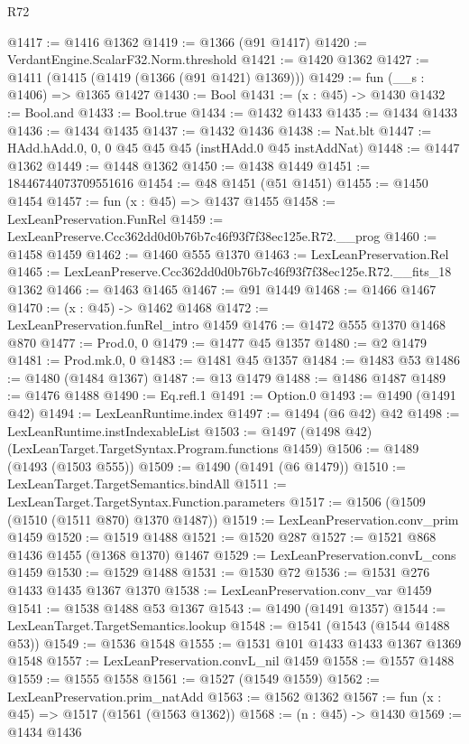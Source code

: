 \begin{lexlean}{R72}
\begin{coremodule}
@1417 := @1416 @1362
@1419 := @1366 (@91 @1417)
@1420 := VerdantEngine.ScalarF32.Norm.threshold
@1421 := @1420 @1362
@1427 := @1411 (@1415 (@1419 (@1366 (@91 @1421) @1369)))
@1429 := fun (__s : @1406) => @1365 @1427
@1430 := Bool
@1431 := (x : @45) -> @1430
@1432 := Bool.and
@1433 := Bool.true
@1434 := @1432 @1433
@1435 := @1434 @1433
@1436 := @1434 @1435
@1437 := @1432 @1436
@1438 := Nat.blt
@1447 := HAdd.hAdd.{0, 0, 0} @45 @45 @45 (instHAdd.{0} @45 instAddNat)
@1448 := @1447 @1362
@1449 := @1448 @1362
@1450 := @1438 @1449
@1451 := 18446744073709551616
@1454 := @48 @1451 (@51 @1451)
@1455 := @1450 @1454
@1457 := fun (x : @45) => @1437 @1455
@1458 := LexLeanPreservation.FunRel
@1459 := LexLeanPreserve.Ccc362dd0d0b76b7c46f93f7f38ec125e.R72.__prog
@1460 := @1458 @1459
@1462 := @1460 @555 @1370
@1463 := LexLeanPreservation.Rel
@1465 := LexLeanPreserve.Ccc362dd0d0b76b7c46f93f7f38ec125e.R72.__fits_18 @1362
@1466 := @1463 @1465
@1467 := @91 @1449
@1468 := @1466 @1467
@1470 := (x : @45) -> @1462 @1468
@1472 := LexLeanPreservation.funRel_intro @1459
@1476 := @1472 @555 @1370 @1468 @870
@1477 := Prod.{0, 0}
@1479 := @1477 @45 @1357
@1480 := @2 @1479
@1481 := Prod.mk.{0, 0}
@1483 := @1481 @45 @1357
@1484 := @1483 @53
@1486 := @1480 (@1484 @1367)
@1487 := @13 @1479
@1488 := @1486 @1487
@1489 := @1476 @1488
@1490 := Eq.refl.{1}
@1491 := Option.{0}
@1493 := @1490 (@1491 @42)
@1494 := LexLeanRuntime.index
@1497 := @1494 (@6 @42) @42
@1498 := LexLeanRuntime.instIndexableList
@1503 := @1497 (@1498 @42) (LexLeanTarget.TargetSyntax.Program.functions @1459)
@1506 := @1489 (@1493 (@1503 @555))
@1509 := @1490 (@1491 (@6 @1479))
@1510 := LexLeanTarget.TargetSemantics.bindAll
@1511 := LexLeanTarget.TargetSyntax.Function.parameters
@1517 := @1506 (@1509 (@1510 (@1511 @870) @1370 @1487))
@1519 := LexLeanPreservation.conv_prim @1459
@1520 := @1519 @1488
@1521 := @1520 @287
@1527 := @1521 @868 @1436 @1455 (@1368 @1370) @1467
@1529 := LexLeanPreservation.convL_cons @1459
@1530 := @1529 @1488
@1531 := @1530 @72
@1536 := @1531 @276 @1433 @1435 @1367 @1370
@1538 := LexLeanPreservation.conv_var @1459
@1541 := @1538 @1488 @53 @1367
@1543 := @1490 (@1491 @1357)
@1544 := LexLeanTarget.TargetSemantics.lookup
@1548 := @1541 (@1543 (@1544 @1488 @53))
@1549 := @1536 @1548
@1555 := @1531 @101 @1433 @1433 @1367 @1369 @1548
@1557 := LexLeanPreservation.convL_nil @1459
@1558 := @1557 @1488
@1559 := @1555 @1558
@1561 := @1527 (@1549 @1559)
@1562 := LexLeanPreservation.prim_natAdd
@1563 := @1562 @1362
@1567 := fun (x : @45) => @1517 (@1561 (@1563 @1362))
@1568 := (n : @45) -> @1430
@1569 := @1434 @1436

\end{coremodule}
\end{lexlean}
